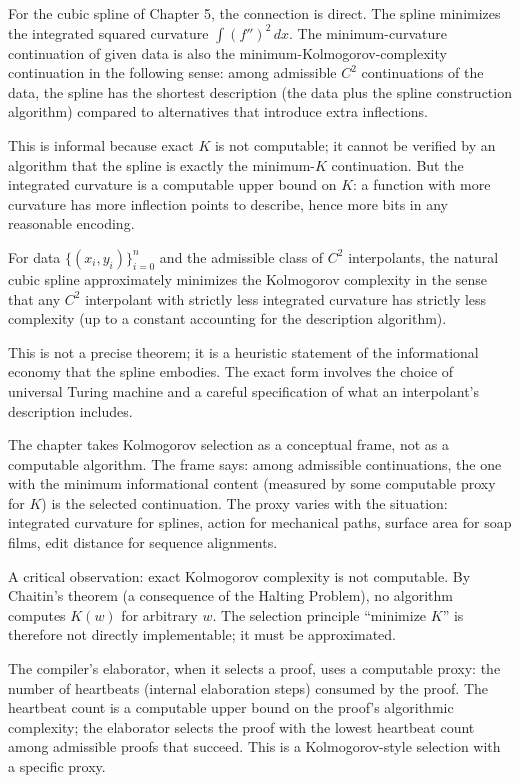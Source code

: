 For the cubic spline of Chapter 5, the connection is direct. The
spline minimizes the integrated squared curvature $\int (f'')^2 \,
dx$. The minimum-curvature continuation of given data is also the
minimum-Kolmogorov-complexity continuation in the following sense:
among admissible $C^2$ continuations of the data, the spline has
the shortest description (the data plus the spline construction
algorithm) compared to alternatives that introduce extra
inflections.

This is informal because exact $K$ is not computable; it cannot be
verified by an algorithm that the spline is exactly the minimum-$K$
continuation. But the integrated curvature is a computable upper
bound on $K$: a function with more curvature has more inflection
points to describe, hence more bits in any reasonable encoding.

\begin{theorem}
For data $\{(x_i, y_i)\}_{i=0}^n$ and the admissible class of $C^2$
interpolants, the natural cubic spline approximately minimizes the
Kolmogorov complexity in the sense that any $C^2$ interpolant with
strictly less integrated curvature has strictly less complexity (up
to a constant accounting for the description algorithm).
\end{theorem}

This is not a precise theorem; it is a heuristic statement of the
informational economy that the spline embodies. The exact form
involves the choice of universal Turing machine and a careful
specification of what an interpolant's description includes.

The chapter takes Kolmogorov selection as a conceptual frame, not as
a computable algorithm. The frame says: among admissible
continuations, the one with the minimum informational content
(measured by some computable proxy for $K$) is the selected
continuation. The proxy varies with the situation: integrated
curvature for splines, action for mechanical paths, surface area
for soap films, edit distance for sequence alignments.

A critical observation: exact Kolmogorov complexity is not
computable. By Chaitin's theorem (a consequence of the Halting
Problem), no algorithm computes $K(w)$ for arbitrary $w$. The
selection principle ``minimize $K$'' is therefore not directly
implementable; it must be approximated.

The compiler's elaborator, when it selects a proof, uses a
computable proxy: the number of heartbeats (internal elaboration
steps) consumed by the proof. The heartbeat count is a computable
upper bound on the proof's algorithmic complexity; the elaborator
selects the proof with the lowest heartbeat count among admissible
proofs that succeed. This is a Kolmogorov-style selection with a
specific proxy.

